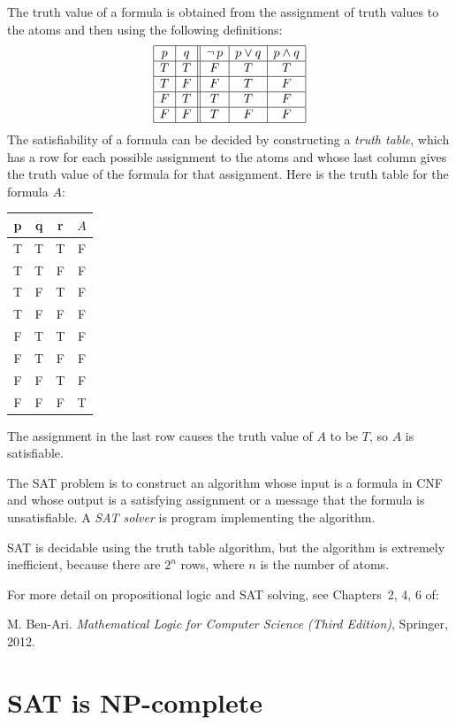 \documentclass[11pt,a4paper]{article}
\newcommand*{\ngg}{\mathop{\neg}}
\begin{document}
The truth value of a formula is obtained from the assignment of truth values to the atoms and then using the following definitions:
\[
\begin{array}{|c|c||c|c|c|}
\hline
p & q & \ngg p & p\vee q & p \wedge q\\\hline
T & T & F & T & T\\\hline
T & F & F & T & F\\\hline
F & T & T & T & F\\\hline
F & F & T & F & F\\\hline
\end{array}
\]
The satisfiability of a formula can be decided by constructing a \emph{truth table}, which has a row for each possible assignment to the atoms and whose last column gives the truth value of the formula for that assignment. Here is the truth table for the formula $A$:
\begin{center}
\begin{tabular}{|c|c|c||c|}
\hline
p & q & r & $A$\\\hline
T & T & T & F\\\hline
T & T & F & F\\\hline
T & F & T & F\\\hline
T & F & F & F\\\hline
F & T & T & F\\\hline
F & T & F & F\\\hline
F & F & T & F\\\hline
F & F & F & T\\\hline
\end{tabular}
\end{center}
The assignment in the last row causes the truth value of $A$ to be $T$, so $A$ is satisfiable.

The SAT problem is to construct an algorithm whose input is a formula in CNF and whose output is a satisfying assignment or a message that the formula is unsatisfiable. A \emph{SAT solver} is program implementing the algorithm.

SAT is decidable using the truth table algorithm, but the algorithm is extremely inefficient, because there are $2^n$ rows, where $n$ is the number of atoms.

For more detail on propositional logic and SAT solving, see Chapters~2, 4, 6 of:

M. Ben-Ari. \textit{Mathematical Logic for Computer Science (Third Edition)}, Springer, 2012.

\section{SAT is NP-complete}
\end{document}
